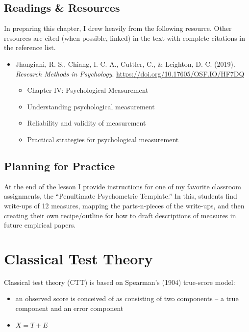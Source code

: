 \documentclass[
  english,
]{book}
\providecommand{\tightlist}{%
  \setlength{\itemsep}{0pt}\setlength{\parskip}{0pt}}
\begin{document}
\hypertarget{readings-resources-5}{%
\subsection{Readings \& Resources}\label{readings-resources-5}}

In preparing this chapter, I drew heavily from the following resource. Other resources are cited (when possible, linked) in the text with complete citations in the reference list.

\begin{itemize}
\tightlist
\item
  Jhangiani, R. S., Chiang, I.-C. A., Cuttler, C., \& Leighton, D. C. (2019). \emph{Research Methods in Psychology}. \url{https://doi.org/10.17605/OSF.IO/HF7DQ}

  \begin{itemize}
  \tightlist
  \item
    Chapter IV: Psychological Measurement
  \item
    Understanding psychological measurement
  \item
    Reliability and validity of measurement
  \item
    Practical strategies for psychological measurement
  \end{itemize}
\end{itemize}

\hypertarget{planning-for-practice}{%
\subsection{Planning for Practice}\label{planning-for-practice}}

At the end of the lesson I provide instructions for one of my favorite classroom assignments, the ``Penultimate Psychometric Template.'' In this, students find write-ups of 12 measures, mapping the parts-n-pieces of the write-ups, and then creating their own recipe/outline for how to draft descriptions of measures in future empirical papers.

\hypertarget{classical-test-theory}{%
\section{Classical Test Theory}\label{classical-test-theory}}

Classical test theory (CTT) is based on Spearman's (1904) true-score model:

\begin{itemize}
\tightlist
\item
  an observed score is conceived of as consisting of two components -- a true component and an error component
\item
  \(X = T + E\)
\end{itemize}
\end{document}
